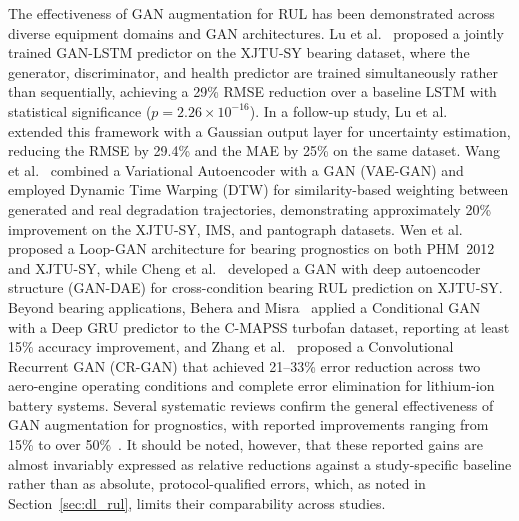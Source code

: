 The effectiveness of GAN augmentation for RUL has been demonstrated
across diverse equipment domains and GAN architectures.
Lu et al.~\cite{9486650} proposed a jointly trained GAN-LSTM
predictor on the XJTU-SY bearing dataset, where the generator,
discriminator, and health predictor are trained simultaneously rather
than sequentially, achieving a 29\% RMSE reduction over a baseline
LSTM with statistical significance ($p = 2.26 \times 10^{-16}$).
In a follow-up study, Lu et al.~\cite{lu_joint_2022} extended this
framework with a Gaussian output layer for uncertainty estimation,
reducing the RMSE by 29.4\% and the MAE by 25\% on the same dataset.
Wang et al.~\cite{vibration7020029} combined a Variational
Autoencoder with a GAN (VAE-GAN) and employed Dynamic Time Warping
(DTW) for similarity-based weighting between generated and real
degradation trajectories, demonstrating approximately 20\%
improvement on the XJTU-SY, IMS, and pantograph datasets.
Wen et al.~\cite{wen_gru-ae-wiener_2024} proposed a Loop-GAN
architecture for bearing prognostics on both PHM~2012 and XJTU-SY,
while Cheng et al.~\cite{cheng_remaining_2023} developed a GAN with
deep autoencoder structure (GAN-DAE) for cross-condition bearing RUL
prediction on XJTU-SY. Beyond bearing applications,
Behera and Misra~\cite{behera_generative_2021} applied a Conditional
GAN with a Deep GRU predictor to the C-MAPSS turbofan dataset,
reporting at least 15\% accuracy improvement, and
Zhang et al.~\cite{9300234} proposed a Convolutional Recurrent GAN
(CR-GAN) that achieved 21--33\% error reduction across two
aero-engine operating conditions and complete error elimination for
lithium-ion battery systems. Several systematic reviews confirm the
general effectiveness of GAN augmentation for prognostics, with
reported improvements ranging from 15\% to over
50\%~\cite{11129693, khan_generative_2025, nieminen_synthetic_2026}.
It should be noted, however, that these reported gains are almost
invariably expressed as relative reductions against a study-specific
baseline rather than as absolute, protocol-qualified errors, which,
as noted in Section~\ref{sec:dl_rul}, limits their comparability
across studies.\\

